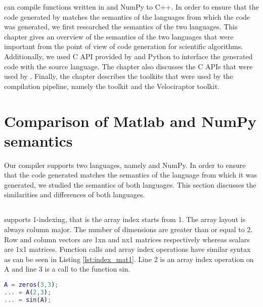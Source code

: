 \velocty can compile functions written in \matlab and NumPy to C++. In order to ensure that the code generated by \velocty matches the semantics of the languages from which the code was generated, we first researched the semantics of the two languages. This chapter gives an overview of the semantics of the two languages that were important from the point of view of code generation for scientific algorithms.  Additionally, we used C API provided by \matlab and Python to interface the generated code with the source language. The chapter also discusses the C APIs that were used by \velocty. Finally, the chapter describes the toolkits that were used by the compilation pipeline, namely the \mclab toolkit and the Velociraptor toolkit. 
\section{Comparison of Matlab and NumPy semantics}
Our compiler supports two languages, namely \matlab and NumPy. In order to ensure that the code generated matches the semantics of the language from which it was generated, we studied the semantics of both languages. This section discusses the similarities and differences of both languages. 
\subsection{\matlab}
\matlab supports 1-indexing, that is the array index starts from 1. 
The array layout is always column major. The number of dimensions are greater than or equal to 2. Row and column vectors are 1xn and nx1 matrices respectively whereas  scalars are 1x1 matrices. Function calls and array index operations have similar syntax as can be seen in Listing \ref{lst:index_mat1}. Line 2 is an array index operation on \textsf{A} and line 3 is a call to the function \textsf{sin}. 
\begin{lstlisting}[language=matlab, label={lst:index_mat1}, caption={An example of an array index operation and a function call. The array index operation and the function call have similar syntax. }]
A = zeros(3,3);
... = A(2,3);
...	= sin(A);
\end{lstlisting}

